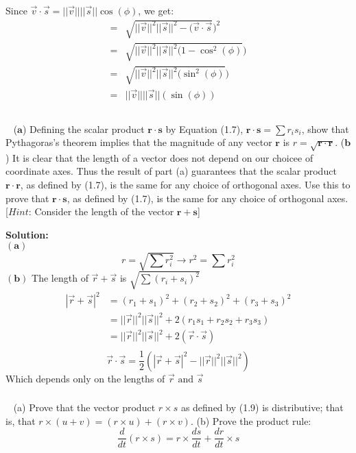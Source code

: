\documentclass{article}
\newcommand\Problem{%
    \subsubsection{}~%
}
\newcommand\TheSolution{%
  \textbf{Solution:}\\%
}
\begin{document}
Since $\vec{v} \cdot \vec{s} = ||\vec{v}||||\vec{s}||\cos(\phi)$, we get:
\begin{equation}
    \begin{aligned}
        = & \sqrt{||\vec{v}||^2||\vec{s}||^2 - (\vec{v} \cdot \vec{s}})^2 \\
        = & \sqrt{||\vec{v}||^2||\vec{s}||^2(1 - \cos^2(\phi)})           \\
        = & \sqrt{||\vec{v}||^2||\vec{s}||^2(\sin^2(\phi)})               \\
        = & \boxed{||\vec{v}||||\vec{s}||(\sin(\phi))}                    \\
    \end{aligned}
\end{equation}

\Problem ($\textbf{a}$) Defining the scalar product $\pmb{r \cdot s}$ by Equation (1.7), $\pmb{r \cdot s} = \sum r_i s_i$, show that Pythagoras's theorem implies that the magnitude of any vector $\textbf{r}$ is $\textit{r} = \sqrt{\pmb{r \cdot r}}$. ($\textbf{b}$) It is clear that the length of a vector does not depend on our choicee of coordinate axes. Thus the result of part (a) guarantees that the scalar product $\pmb{r \cdot r}$, as defined by (1.7), is the same for any choice of orthogonal axes. Use this to prove that $\pmb{r \cdot s}$, as defined by (1.7), is the same for any choice of orthogonal axes. [$\textit{Hint:}$ Consider the length of the vector $\pmb{r + s}$]

\TheSolution
$(\textbf{a})$ \[\textit{r} = \sqrt{\sum r_i^2} \rightarrow \textit{r}^2 = \sum r_i^2\]
$(\textbf{b})$ The length of $\vec{r} + \vec{s}$ is  $\sqrt{\sum (r_i + s_i)^2}$
\begin{equation}
    \begin{aligned}
        |\vec{r} + \vec{s}|^2 & = (r_1 + s_1)^2 + (r_2 + s_2)^2 + (r_3 + s_3)^2               \\
                              & = ||\vec{r}||^2||\vec{s}||^2 + 2(r_1 s_1 + r_2 s_2 + r_3 s_3) \\
                              & = ||\vec{r}||^2||\vec{s}||^2 + 2(\vec{r} \cdot \vec{s})       \\
    \end{aligned}
\end{equation}
\[\boxed{\vec{r} \cdot \vec{s} = \frac{1}{2}(|\vec{r} + \vec{s}|^2 - ||\vec{r}||^2||\vec{s}||^2)}\]
Which depends only on the lengths of $\vec{r} \text{ and } \vec{s}$


\Problem (a) Prove that the vector product $r \times s$ as defined by (1.9) is distributive; that is, that $r \times (u + v) = (r \times u) + (r \times v)$. (b) Prove the product rule:
\[ \frac{d}{dt} (r \times s) = r \times \frac{ds}{dt} + \frac{dr}{dt} \times s  \]
\end{document}
